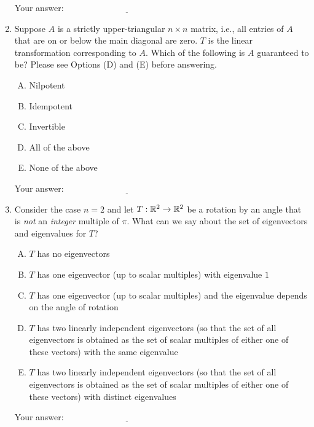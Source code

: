 \documentclass[10pt]{amsart}
\begin{document}
\begin{enumerate}
  \vspace{0.1in}
  Your answer: $\underline{\qquad\qquad\qquad\qquad\qquad\qquad\qquad}$
  \vspace{0.1in}

\item Suppose $A$ is a strictly upper-triangular $n \times n$ matrix,
  i.e., all entries of $A$ that are on or below the main diagonal are
  zero. $T$ is the linear transformation corresponding to $A$. Which
  of the following is $A$ guaranteed to be? Please see Options (D) and
  (E) before answering.

  \begin{enumerate}[(A)]
  \item Nilpotent
  \item Idempotent
  \item Invertible
  \item All of the above
  \item None of the above
  \end{enumerate}

  \vspace{0.1in}
  Your answer: $\underline{\qquad\qquad\qquad\qquad\qquad\qquad\qquad}$
  \vspace{0.1in}

\item Consider the case $n = 2$ and let $T:\mathbb{R}^2 \to \mathbb{R}^2$ be a
  rotation by an angle that is {\em not} an {\em integer} multiple of
  $\pi$. What can we say about the set of eigenvectors and eigenvalues
  for $T$?

  \begin{enumerate}[(A)]
  \item $T$ has no eigenvectors
  \item $T$ has one eigenvector (up to scalar multiples) with
    eigenvalue $1$
  \item $T$ has one eigenvector (up to scalar multiples) and the
    eigenvalue depends on the angle of rotation
  \item $T$ has two linearly independent eigenvectors (so that the set
    of all eigenvectors is obtained as the set of scalar multiples of
    either one of these vectors) with the same eigenvalue
  \item $T$ has two linearly independent eigenvectors (so that the set
    of all eigenvectors is obtained as the set of scalar multiples of
    either one of these vectors) with distinct eigenvalues
  \end{enumerate}

  \vspace{0.1in}
  Your answer: $\underline{\qquad\qquad\qquad\qquad\qquad\qquad\qquad}$
  \vspace{0.1in}
\end{enumerate}
\end{document}
